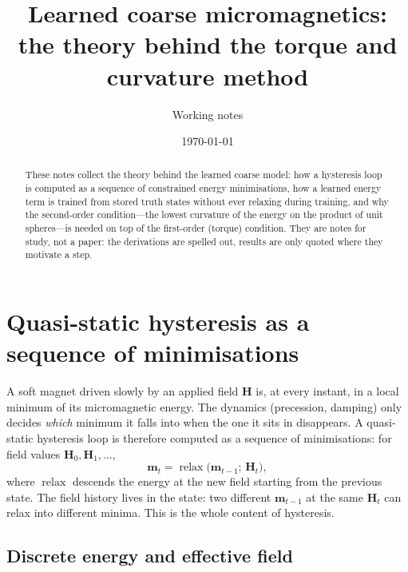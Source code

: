 \documentclass[11pt,a4paper]{article}
\title{Learned coarse micromagnetics: the theory behind the torque and curvature method}
\author{Working notes}
\date{\today}
\newcommand{\m}{\bm{m}}
\newcommand{\Hext}{\bm{H}}
\begin{document}
\maketitle

\begin{abstract}
These notes collect the theory behind the learned coarse model: how a hysteresis loop is computed as a
sequence of constrained energy minimisations, how a learned energy term is trained from stored truth
states without ever relaxing during training, and why the second-order condition---the lowest curvature
of the energy on the product of unit spheres---is needed on top of the first-order (torque) condition.
They are notes for study, not a paper: the derivations are spelled out, results are only quoted where
they motivate a step.
\end{abstract}

\tableofcontents

\section{Quasi-static hysteresis as a sequence of minimisations}

A soft magnet driven slowly by an applied field $\Hext$ is, at every instant, in a local minimum of its
micromagnetic energy. The dynamics (precession, damping) only decides \emph{which} minimum it falls
into when the one it sits in disappears. A quasi-static hysteresis loop is therefore computed as a
sequence of minimisations: for field values $\Hext_0, \Hext_1, \dots$,
\begin{equation}
  \m_t = \operatorname{relax}\bigl(\m_{t-1};\, \Hext_t\bigr),
  \label{eq:loop}
\end{equation}
where $\operatorname{relax}$ descends the energy at the new field starting from the previous state. The
field history lives in the state: two different $\m_{t-1}$ at the same $\Hext_t$ can relax into
different minima. This is the whole content of hysteresis.

\subsection{Discrete energy and effective field}
\end{document}
